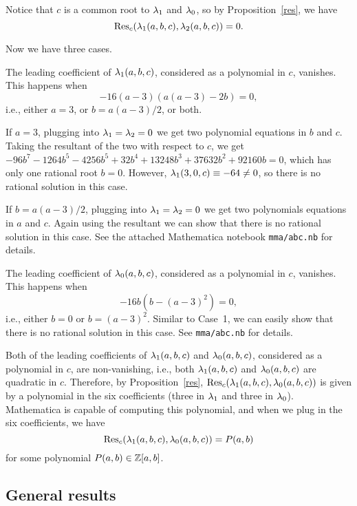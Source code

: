 Notice that $c$ is a common root to $\lambda_1$ and $\lambda_0$, so by
Proposition~\ref{res}, we have
\[
\mathrm{Res}_c(\lambda_1(a, b, c), \lambda_2(a, b, c)) = 0.
\]

Now we have three cases.

\begin{case}
  The leading coefficient of $\lambda_1(a, b, c)$, considered as a
  polynomial in $c$, vanishes. This happens when
  \[
  -16(a - 3)(a(a-3) - 2b) = 0,
  \]
  i.e., either $a = 3$, or $b = a(a-3)/2$, or both.

  If $a = 3$, plugging into $\lambda_1 = \lambda_2 = 0$ we get two polynomial
  equations in $b$ and $c$. Taking the resultant of the two with
  respect to $c$, we get $- 96b^7 - 1264b^5 - 4256b^5 + 32b^4 +
  13248b^3 + 37632b^2 + 92160b = 0$, which has only one rational root
  $b = 0$. However, $\lambda_1(3, 0, c) \equiv -64 \ne 0$, so there is no
  rational solution in this case.

  If $b = a(a-3)/2$, plugging into $\lambda_1 = \lambda_2 = 0$ we get two
  polynomials equations in $a$ and $c$. Again using the resultant we
  can show that there is no rational solution in this case. See the
  attached Mathematica notebook \texttt{mma/abc.nb} for details.
\end{case}

\begin{case}
  The leading coefficient of $\lambda_0(a, b, c)$, considered as a
  polynomial in $c$, vanishes. This happens when
  \[
  -16b(b - (a-3)^2) = 0,
  \]
  i.e., either $b = 0$ or $b = (a - 3)^2$. Similar to Case~1, we can
  easily show that there is no rational solution in this case. See
  \texttt{mma/abc.nb} for details.
\end{case}

\begin{case}
  Both of the leading coefficients of $\lambda_1(a, b, c)$ and $\lambda_0(a, b,
  c)$, considered as a polynomial in $c$, are non-vanishing, i.e.,
  both $\lambda_1(a, b, c)$ and $\lambda_0(a, b, c)$ are quadratic in
  $c$. Therefore, by Proposition~\ref{res}, $\mathrm{Res}_c(\lambda_1(a, b, c),
  \lambda_0(a, b, c))$ is given by a polynomial in the six coefficients
  (three in $\lambda_1$ and three in $\lambda_0$). Mathematica is capable of
  computing this polynomial, and when we plug in the six coefficients,
  we have
  \[
  \mathrm{Res}_c(\lambda_1(a, b, c), \lambda_0(a, b, c)) = P(a, b)
  \]
  for some polynomial $P(a, b) \in \mathbb{Z}[a, b]$.
\end{case}

\subsection{General results}

